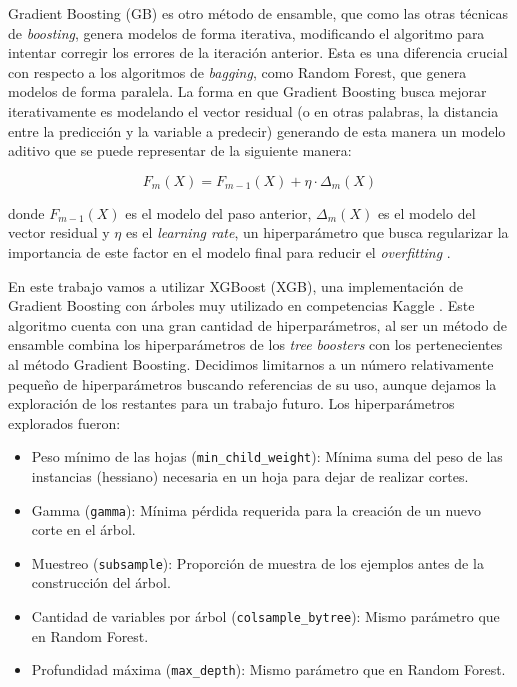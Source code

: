 Gradient Boosting (GB) es otro método de ensamble, que como las otras técnicas de \textit{boosting}, genera modelos de forma iterativa, modificando el algoritmo para intentar corregir los errores de la iteración anterior. Esta es una diferencia crucial con respecto a los algoritmos de \textit{bagging}, como Random Forest, que genera modelos de forma paralela. La forma en que Gradient Boosting busca mejorar iterativamente es modelando el vector residual (o en otras palabras, la distancia entre la predicción y la variable a predecir) generando de esta manera un modelo aditivo que se puede representar de la siguiente manera:

\begin{equation*}
    F_{m}(X) = F_{m - 1}(X) + \eta \cdot \Delta_{m}(X) 
\end{equation*}

donde $F_{m - 1}(X)$ es el modelo del paso anterior, $\Delta_{m}(X)$ es el modelo del vector residual y $\eta$ es el \textit{learning rate}, un hiperparámetro que busca regularizar la importancia de este factor en el modelo final para reducir el \textit{overfitting} \cite{gradient}. 

En este trabajo vamos a utilizar XGBoost (XGB), una implementación de Gradient Boosting con árboles muy utilizado en competencias Kaggle \cite{xgboost}. Este algoritmo cuenta con una gran cantidad de hiperparámetros, al ser un método de ensamble combina los hiperparámetros de los \textit{tree boosters} con los pertenecientes al método Gradient Boosting. Decidimos limitarnos a un número relativamente pequeño de hiperparámetros buscando referencias de su uso, aunque dejamos la exploración de los restantes para un trabajo futuro. Los hiperparámetros explorados fueron:

\begin{itemize}
    \item Peso mínimo de las hojas (\texttt{min\_child\_weight}): Mínima suma del peso de las instancias (hessiano) necesaria en un hoja para dejar de realizar cortes.
    \item Gamma (\texttt{gamma}): Mínima pérdida requerida para la creación de un nuevo corte en el árbol.
    \item Muestreo (\texttt{subsample}): Proporción de muestra de los ejemplos antes de la construcción del árbol. 
    \item Cantidad de variables por árbol (\texttt{colsample\_bytree}): Mismo parámetro que en Random Forest.
    \item Profundidad máxima (\texttt{max\_depth}): Mismo parámetro que en Random Forest.
\end{itemize}

